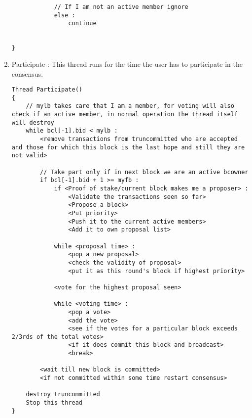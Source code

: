 \begin{enumerate}
\begin{lstlisting}
            // If I am not an active member ignore
            else :
                continue

                
}
\end{lstlisting}
    \item Participate : This thread runs for the time the user has to participate in the consensus.
\begin{lstlisting}
Thread Participate()
{
    // mylb takes care that I am a member, for voting will also check if an active member, in normal operation the thread itself will destroy
    while bcl[-1].bid < mylb :
        <remove transactions from truncommitted who are accepted and those for which this block is the last hope and still they are not valid>
        
        // Take part only if in next block we are an active bcowner
        if bcl[-1].bid + 1 >= myfb :
            if <Proof of stake/current block makes me a proposer> :
                <Validate the transactions seen so far>
                <Propose a block>
                <Put priority>
                <Push it to the current active members>
                <Add it to own proposal list>
            
            while <proposal time> :
                <pop a new proposal>
                <check the validity of proposal>
                <put it as this round's block if highest priority> 

            <vote for the highest proposal seen>

            while <voting time> :
                <pop a vote>
                <add the vote>
                <see if the votes for a particular block exceeds 2/3rds of the total votes>
                <if it does commit this block and broadcast>
                <break> 

        <wait till new block is committed>
        <if not committed within some time restart consensus>

    destroy truncommitted
    Stop this thread
}
\end{lstlisting}
\end{enumerate}


